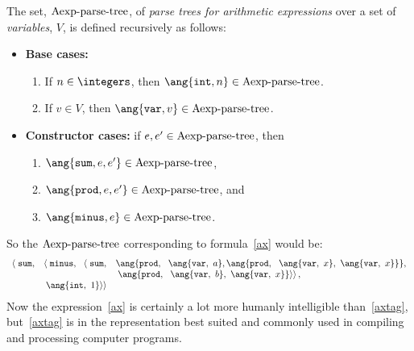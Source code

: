 \begin{editingnotes}
\begin{definition}\label{arithparse}
The set, $\text{Aexp-parse-tree}$, of \emph{parse trees for arithmetic expressions} 
over a set of
\emph{variables}, $V$, is defined recursively as follows:
\begin{itemize}
\item \textbf{Base cases:}
\begin{enumerate}
\item If $n \in \integers$, then $\ang{\texttt{int}, n} \in \paexp$.
\item If $v \in V$, then $\ang{\texttt{var}, v} \in \paexp$.
\end{enumerate}
\item \textbf{Constructor cases:} if $e,e' \in \text{Aexp-parse-tree}$, then
\begin{enumerate}
\item $\ang{\texttt{sum}, e, e'} \in \paexp$,
\item $\ang{\texttt{prod}, e, e'} \in \paexp$, and
\item $\ang{\texttt{minus}, e} \in \paexp$.
\end{enumerate}
\end{itemize}
\end{definition}

So the $\text{Aexp-parse-tree}$ corresponding to formula~\ref{ax} would be:
\begin{equation}\label{axtag}
\begin{array}{rll}
\left< \right. \texttt{sum}, 
         & \left< \right. \texttt{minus},\ \ \left< \right. \texttt{sum},
               & \ang{\texttt{prod},\ \ \ang{\texttt{var},\ a},
                                     \ang{\texttt{prod},\ \
                                            \ang{\texttt{var},\ x},\
                                            \ang{\texttt{var},\ x}}},\\
                               && \left. \left. \ang{\texttt{prod},\ \
                                       \ang{\texttt{var},\ b},\
                                       \ang{\texttt{var},\ x}}
                                   \right> \right>,\\
         & \left. \left. \ang{\texttt{int},\ 1} \right> \right>
\end{array}
\end{equation}
Now the expression~\ref{ax} is certainly a lot more humanly
intelligible than~\ref{axtag}, but~\ref{axtag} is in the
representation best suited and commonly used in compiling and
processing computer programs.

\end{editingnotes}


